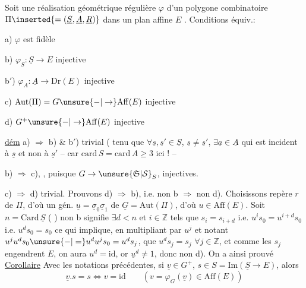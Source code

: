   Soit une réalisation géométrique
régulière $\varphi$  d'un polygone combinatoire
$\Pi\inserted{=(\underline S,\underline A,\underline R)}$ dans un plan affine $E$ . Conditions équiv.:

a) $\varphi$ est fidèle

b) $\varphi_S:\underline S\to E$ injective

b$'$) $\varphi_A:\underline A\to\mathrm{Dr}(E)$ injective

c) $\mathrm{Aut}(\Pi)=G\unsure{-|\to}\mathrm{Aff}(E)$ injective

d) 
 $G^+\unsure{-|\to}\mathrm{Aff}(E)$ injective

\uline{dém} a) $\Rightarrow$ b) \& b$'$) trivial ( tenu que
$\forall\underline s,\underline s'\in\underline S$, $\underline s\ne\underline s'$, $\exists\underline a\in\underline A$ qui est incident à $\underline s$ et
non à $\underline s'$ -- car $\mathrm{card}\,S=\mathrm{card}\,A\geq3$ ici ! -- 

b) $\Rightarrow$ c),  , puisque $G\to\unsure{\mathfrak S|\mathcal S}_S$,  injectives.

 c) $\Rightarrow$ d) trivial. Prouvons
d) $\Rightarrow$ b), i.e. non b $\Rightarrow$ non d). Choisissons
 repère $r$ de $\Pi$, d'où un gén.
 $\underline u=\underline\sigma_0\underline\sigma_1$ de $\underline G=\mathrm{Aut}(\Pi)$, d'où $u\in\mathrm{Aff}(E)$.
 Soit $n=\mathrm{Card}\,\underline S$ ( )
  non b signifie $\exists d<n$ 
 et $i\in\mathbb Z$ tels que $s_i=s_{i+d}$ i.e.
$u^is_0=u^{i+d}s_0$ i.e.  $u^ds_0=s_0$ ce qui
implique, en multipliant par $u^j$ et
notant $u^ju^ds_0\unsure{-|=}u^du^js_0=u^ds_j$, que
$u^ds_j=s_j$ $\forall j\in\mathbb Z$, et comme les $s_j$ engendrent
$E$, on aura $u^{d}=\mathrm{id}$,  or $\underline u^d\ne1$, donc
non d). On a ainsi prouvé
\uline{Corollaire} Avec les notations précédentes, si
$\underline v\in G^+$, $s\in S=\mathrm{Im}(\underline S\to E)$, alors
\[
\underline v.s=s\Longleftrightarrow v=\mathrm{id}\qquad (v=\varphi_G(\underline v)\in\mathrm{Aff}(E))
\]

